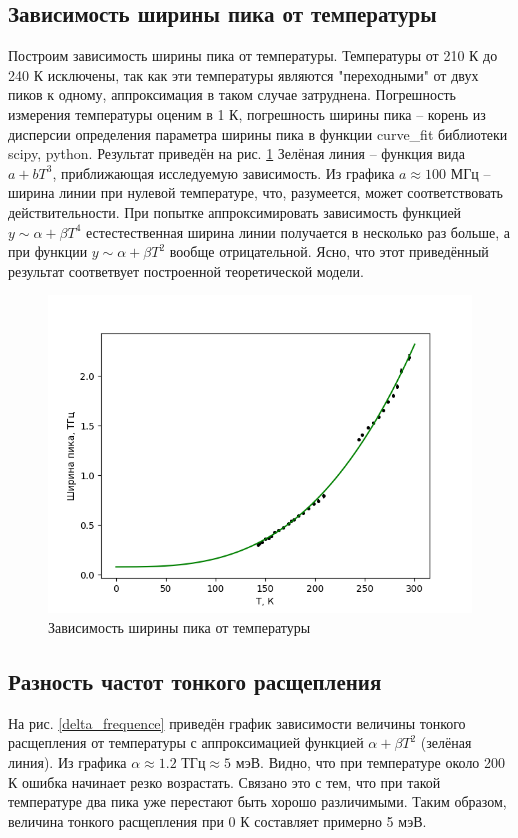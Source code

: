 \newpage

\subsection{Зависимость ширины пика от температуры}
Построим зависимость ширины пика от температуры. Температуры от 210 К до 240 К 
исключены, так как эти температуры являются "переходными" от двух пиков к одному,
аппроксимация в таком случае затруднена. Погрешность измерения температуры оценим в
1 К, погрешность ширины пика -- корень из дисперсии определения параметра ширины пика 
в функции curve\_fit библиотеки scipy, python. Результат приведён на рис. \ref{peak_width}
Зелёная линия -- функция вида $a + bT^3$, приближающая исследуемую зависимость. 
Из графика $a \approx 100 \text{ МГц}$ -- ширина линии при нулевой температуре, что, разумеется,
может соответствовать действительности. При попытке аппроксимировать зависимость
функцией $y \sim \alpha + \beta T^4$ естестественная ширина линии получается в несколько
раз больше, а при функции $y \sim \alpha + \beta T^2$ вообще отрицательной. 
Ясно, что этот приведённый результат соответвует построенной теоретической модели. 

\begin{figure}[!h]
    \begin{center}
        \includegraphics[width=0.6 \linewidth]{peak_width.png}
        \caption{Зависимость ширины пика от температуры}
        \label{peak_width}
    \end{center}
\end{figure}


\newpage
\subsection{Разность частот тонкого расщепления}
На рис. \ref{delta_frequence} приведён график зависимости величины тонкого
расщепления от температуры с аппроксимацией функцией $\alpha + \beta T^2$ (зелёная
линия). Из графика $\alpha \approx 1.2 \text{ ТГц} \approx 5 \text{ мэВ}$. Видно, что 
при температуре около 200 К ошибка начинает резко возрастать. Связано это с тем, что 
при такой температуре два пика уже перестают быть хорошо различимыми. Таким образом, 
величина тонкого расщепления при 0 К составляет примерно 5 мэВ.


